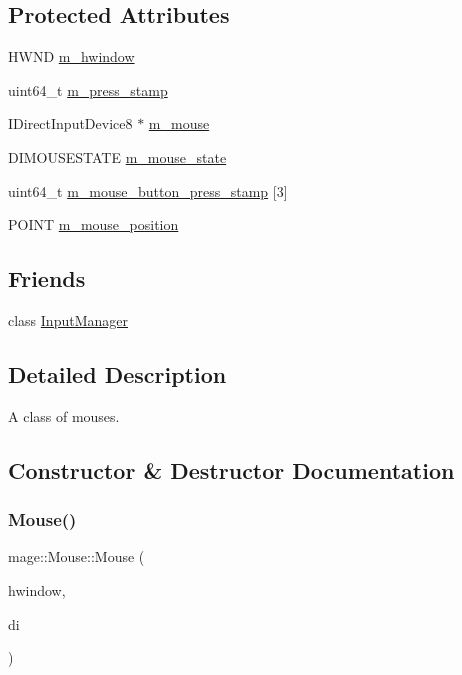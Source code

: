 \subsection*{Protected Attributes}
\begin{DoxyCompactItemize}
\item 
H\+W\+ND \hyperlink{classmage_1_1_mouse_a0c67906df7b8b0cce013c724be4625ac}{m\+\_\+hwindow}
\item 
uint64\+\_\+t \hyperlink{classmage_1_1_mouse_a32b30d3c37a2082869f4ff4f522dfbf8}{m\+\_\+press\+\_\+stamp}
\item 
I\+Direct\+Input\+Device8 $\ast$ \hyperlink{classmage_1_1_mouse_a873713cdf019671a94952d88faeb2b7a}{m\+\_\+mouse}
\item 
D\+I\+M\+O\+U\+S\+E\+S\+T\+A\+TE \hyperlink{classmage_1_1_mouse_af99645fb4226077abee4532a5e663066}{m\+\_\+mouse\+\_\+state}
\item 
uint64\+\_\+t \hyperlink{classmage_1_1_mouse_a0f5a38e23bdf7eae1b7b1030a53edff0}{m\+\_\+mouse\+\_\+button\+\_\+press\+\_\+stamp} \mbox{[}3\mbox{]}
\item 
P\+O\+I\+NT \hyperlink{classmage_1_1_mouse_a2a8332ef7a4daa0f9ed48a9a1ad80684}{m\+\_\+mouse\+\_\+position}
\end{DoxyCompactItemize}
\subsection*{Friends}
\begin{DoxyCompactItemize}
\item 
class \hyperlink{classmage_1_1_mouse_af0e8c3dcc20b7ddcaf63506363a22821}{Input\+Manager}
\end{DoxyCompactItemize}


\subsection{Detailed Description}
A class of mouses. 

\subsection{Constructor \& Destructor Documentation}
\hypertarget{classmage_1_1_mouse_ad02365977dab44603400ac6f24e0df97}{}\label{classmage_1_1_mouse_ad02365977dab44603400ac6f24e0df97} 
\subsubsection{\texorpdfstring{Mouse()}{Mouse()}}
{\footnotesize\ttfamily mage\+::\+Mouse\+::\+Mouse (\begin{DoxyParamCaption}\item[{H\+W\+ND}]{hwindow,  }\item[{I\+Direct\+Input8 $\ast$}]{di }\end{DoxyParamCaption})\hspace{0.3cm}{\ttfamily [protected]}}

